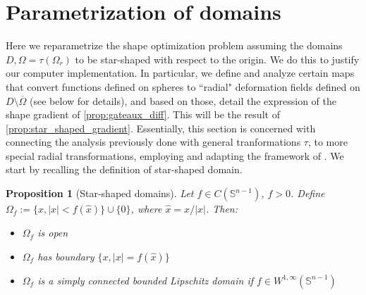 \documentclass[english,a4paper,9pt,oneside]{scrbook}	%
\theoremstyle{break}
\newtheorem{prop}[equation]{Proposition}
\theoremstyle{remark}
\newtheorem{obs}[equation]{Observation}
\newcommand{\mS}{\mathbb{S}^{n-1}}
\newcommand{\xh}{\hat{x}}
\begin{document}

\section{Parametrization of domains}
\label{sec:star}

Here we reparametrize the shape optimization problem assuming the domains $D, \Omega=\tau(\Omega_r)$ to be star-shaped with respect to the origin. We do this to justify our computer implementation. In particular, we define and analyze certain maps that convert functions defined on spheres to ``radial" deformation fields defined on $D\setminus \overline{\Omega}$ (see below for details), and based on those, detail the expression of the shape gradient of \cref{prop:gateaux_diff}. This will be the result of \cref{prop:star_shaped_gradient}. Essentially, this section is concerned with connecting the analysis previously done with general tranformations $\tau$, to more special radial transformations, employing and adapting the framework of \cite{deckelnick}. We start by recalling the definition of star-shaped domain.


\begin{prop}[Star-shaped domains]
Let $f \in C(\mS)$, $f>0$. Define $\Omega_f:=\{x, |x|<f(\xh)\}\cup\{0\}$, where $\xh=x/|x|$. Then:
\begin{itemize}
\item $\Omega_f$ is open
\item $\Omega_f$ has boundary $\{x, |x|=f(\xh)\}$
\item $\Omega_f$ is a simply connected bounded Lipschitz domain if $f \in W^{1,\infty}(\mS)$
\end{itemize}
\end{prop}
%
\end{document}
